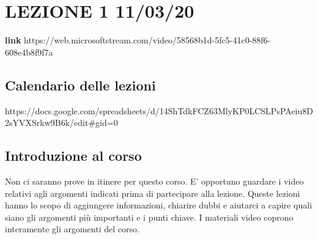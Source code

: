 \section{LEZIONE 1 11/03/20}
\textbf{link}
https://web.microsoftstream.com/video/58568b1d-5fc5-41c0-88f6-608e4b8f9f7a
\subsection{Calendario delle lezioni}
https://docs.google.com/spreadsheets/d/14ShTdkFCZ63MlyKP0LCSLPsPAeiu8D2sYVXSrkw9B6k/edit\#gid=0
\subsection{Introduzione al corso}
Non ci saranno prove in itinere per questo corso.\newline
E' opportuno guardare i video relativi agli argomenti indicati prima di partecipare alla lezione.\newline
Queste lezioni hanno lo scopo di aggiungere informazioni, chiarire dubbi e aiutarci a capire quali siano gli argomenti più importanti e i punti chiave.\newline
I materiali video coprono interamente gli argomenti del corso.
